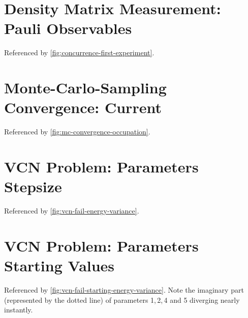 \newpage
\begin{minipage}{\textwidth}
    \section{Density Matrix Measurement: Pauli Observables}
        \label{appendix:pauli-measurements}
        Referenced by \autoref{fig:concurrence-first-experiment}.\\
        \vbox{
        }
\end{minipage}

\newpage
\begin{minipage}{\textwidth}
    \section{Monte-Carlo-Sampling Convergence: Current}
        \label{appendix:mc-convergence-spin-current}
        Referenced by \autoref{fig:mc-convergence-occupation}.\\
        \vbox{
        }
\end{minipage}

\newpage
\begin{minipage}{\textwidth}
    \section{VCN Problem: Parameters Stepsize}
        \label{appendix:vcn-fail-parameters}
        Referenced by \autoref{fig:vcn-fail-energy-variance}.\\
        \vbox{
        }
\end{minipage}

\newpage
\begin{minipage}{\textwidth}
    \section{VCN Problem: Parameters Starting Values}
        \label{appendix:vcn-fail-starting-parameters}
        Referenced by \autoref{fig:vcn-fail-starting-energy-variance}. Note the imaginary part (represented by the dotted line) of parameters 1,\,2,\,4 and 5 diverging nearly instantly.\\
        \vbox{
        }
\end{minipage}